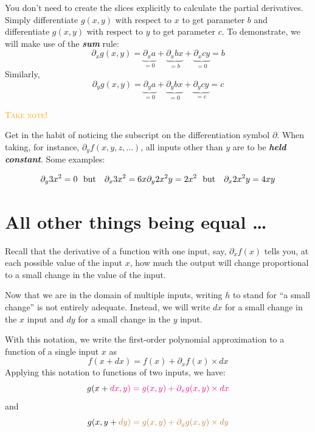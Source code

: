 \documentclass[
  letterpaper,
  DIV=11,
  numbers=noendperiod,
  oneside]{scrreprt}
\newenvironment{takenote}%
{%
\textcolor{orange}{\hrulefill}%
  \par\vspace{.3\baselineskip}%
  \textcolor{orange}{\scshape Take note!}%
  \par\vspace{\baselineskip}%
}%
{\textcolor{orange}{\hrulefill}}
\begin{document}
You don't need to create the slices explicitly to calculate the partial
derivatives. Simply differentiate \(g(x, y)\) with respect to \(x\) to
get parameter \(b\) and differentiate \(g(x, y)\) with respect to \(y\)
to get parameter \(c\). To demonstrate, we will make use of the
\textbf{\emph{sum}} rule:
\[\partial_x g(x, y) = \underbrace{\partial_x a}_{=0} + \underbrace{\partial_x b x}_{=b} + \underbrace{\partial_x cy}_{=0} = b\]
Similarly,
\[\partial_y g(x, y) = \underbrace{\partial_y a}_{=0} + \underbrace{\partial_y b x}_{=0} + \underbrace{\partial_y cy}_{=c} = c\]

\begin{takenote}
Get in the habit of noticing the subscript on the differentiation symbol
\(\partial\). When taking, for instance,
\(\partial_y f(x,y,z, \ldots)\), all inputs other than \(y\) are to be
\textbf{\emph{held constant}}. Some examples:

\[\partial_y 3 x^2 = 0\ \ \text{but}\ \ \ 
\partial_x 3 x^2 = 6x\\
\ \\
\partial_y 2 x^2 y = 2x^2\ \ \text{but}\ \ \
\partial_x 2 x^2 y = 4 x y
\]

\end{takenote}

\hypertarget{all-other-things-being-equal}{%
\section{All other things being equal
\ldots{}}\label{all-other-things-being-equal}}

Recall that the derivative of a function with one input, say,
\(\partial_x f(x)\) tells you, at each possible value of the input
\(x\), how much the output will change proportional to a small change in
the value of the input.

Now that we are in the domain of multiple inputs, writing \(h\) to stand
for ``a small change'' is not entirely adequate. Instead, we will write
\(dx\) for a small change in the \(x\) input and \(dy\) for a small
change in the \(y\) input.

With this notation, we write the first-order polynomial approximation to
a function of a single input \(x\) as
\[f(x+dx) = f(x) + \partial_x f(x) \times dx\] Applying this notation to
functions of two inputs, we have:
\[g(x + \color{magenta}{dx}, y) = g(x,y) + \color{magenta}{\partial_x} g(x,y) \times \color{magenta}{dx}\]
and
\[g(x, y+\color{brown}{dy}) = g(x,y) + \color{brown}{\partial_y} g(x,y) \times \color{brown}{dy}\]
\end{document}
